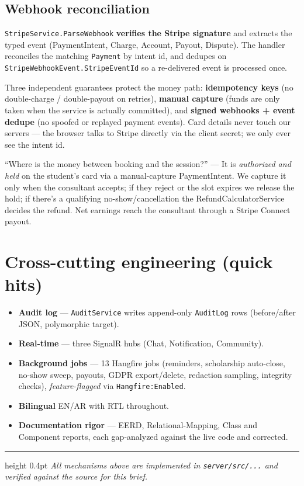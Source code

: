 \documentclass[11pt,a4paper]{article}
\newcommand{\code}[1]{\texttt{\textcolor{spInk}{#1}}}
\begin{document}
\subsection{Webhook reconciliation}
\code{StripeService.ParseWebhook} \textbf{verifies the Stripe signature} and
extracts the typed event (PaymentIntent, Charge, Account, Payout, Dispute). The
handler reconciles the matching \code{Payment} by intent id, and dedupes on
\code{StripeWebhookEvent.StripeEventId} so a re-delivered event is processed once.

\begin{secbox}
Three independent guarantees protect the money path: \textbf{idempotency keys}
(no double-charge / double-payout on retries), \textbf{manual capture} (funds are
only taken when the service is actually committed), and \textbf{signed webhooks +
event dedupe} (no spoofed or replayed payment events). Card details never touch
our servers --- the browser talks to Stripe directly via the client secret; we
only ever see the intent id.
\end{secbox}

\begin{qabox}
``Where is the money between booking and the session?'' --- It is \emph{authorized
and held} on the student's card via a manual-capture PaymentIntent. We capture it
only when the consultant accepts; if they reject or the slot expires we release the
hold; if there's a qualifying no-show/cancellation the RefundCalculatorService
decides the refund. Net earnings reach the consultant through a Stripe Connect
payout.
\end{qabox}

\section{Cross-cutting engineering (quick hits)}
\begin{itemize}
\item \textbf{Audit log} --- \code{AuditService} writes append-only \code{AuditLog}
  rows (before/after JSON, polymorphic target).
\item \textbf{Real-time} --- three SignalR hubs (Chat, Notification, Community).
\item \textbf{Background jobs} --- 13 Hangfire jobs (reminders, scholarship
  auto-close, no-show sweep, payouts, GDPR export/delete, redaction sampling,
  integrity checks), \emph{feature-flagged} via \code{Hangfire:Enabled}.
\item \textbf{Bilingual} EN/AR with RTL throughout.
\item \textbf{Documentation rigor} --- EERD, Relational-Mapping, Class and Component
  reports, each gap-analyzed against the live code and corrected.
\end{itemize}

\vspace{6pt}\hrule height 0.4pt\vspace{4pt}
{\small\itshape\color{spInk} All mechanisms above are implemented in
\code{server/src/...} and verified against the source for this brief.}
\end{document}
